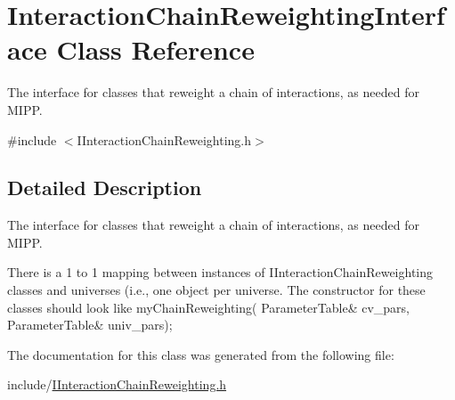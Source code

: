 \hypertarget{class_interaction_chain_reweighting_interface}{\section{Interaction\-Chain\-Reweighting\-Interface Class Reference}
\label{class_interaction_chain_reweighting_interface}
}


The interface for classes that reweight a chain of interactions, as needed for M\-I\-P\-P.  




{\ttfamily \#include $<$I\-Interaction\-Chain\-Reweighting.\-h$>$}



\subsection{Detailed Description}
The interface for classes that reweight a chain of interactions, as needed for M\-I\-P\-P. 

There is a 1 to 1 mapping between instances of I\-Interaction\-Chain\-Reweighting classes and universes (i.\-e., one object per universe. The constructor for these classes should look like my\-Chain\-Reweighting( Parameter\-Table\& cv\-\_\-pars, Parameter\-Table\& univ\-\_\-pars); 

The documentation for this class was generated from the following file\-:\begin{DoxyCompactItemize}
\item 
include/\hyperlink{_i_interaction_chain_reweighting_8h}{I\-Interaction\-Chain\-Reweighting.\-h}\end{DoxyCompactItemize}
